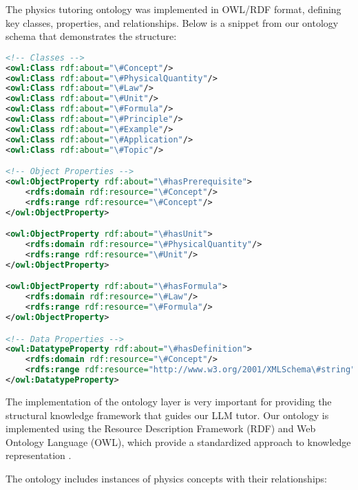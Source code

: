 The physics tutoring ontology was implemented in OWL/RDF format, defining key classes, properties, and relationships. Below is a snippet from our ontology schema that demonstrates the structure:

\begin{lstlisting}[language=XML, caption=Physics Tutor Ontology Schema, label=lst:ontology]
<!-- Classes -->
<owl:Class rdf:about="\#Concept"/>
<owl:Class rdf:about="\#PhysicalQuantity"/>
<owl:Class rdf:about="\#Law"/>
<owl:Class rdf:about="\#Unit"/>
<owl:Class rdf:about="\#Formula"/>
<owl:Class rdf:about="\#Principle"/>
<owl:Class rdf:about="\#Example"/>
<owl:Class rdf:about="\#Application"/>
<owl:Class rdf:about="\#Topic"/>

<!-- Object Properties -->
<owl:ObjectProperty rdf:about="\#hasPrerequisite">
    <rdfs:domain rdf:resource="\#Concept"/>
    <rdfs:range rdf:resource="\#Concept"/>
</owl:ObjectProperty>

<owl:ObjectProperty rdf:about="\#hasUnit">
    <rdfs:domain rdf:resource="\#PhysicalQuantity"/>
    <rdfs:range rdf:resource="\#Unit"/>
</owl:ObjectProperty>

<owl:ObjectProperty rdf:about="\#hasFormula">
    <rdfs:domain rdf:resource="\#Law"/>
    <rdfs:range rdf:resource="\#Formula"/>
</owl:ObjectProperty>

<!-- Data Properties -->
<owl:DatatypeProperty rdf:about="\#hasDefinition">
    <rdfs:domain rdf:resource="\#Concept"/>
    <rdfs:range rdf:resource="http://www.w3.org/2001/XMLSchema\#string"/>
</owl:DatatypeProperty>
\end{lstlisting}

The implementation of the ontology layer is very important for providing the structural knowledge framework that guides our LLM tutor. Our ontology is implemented using the Resource Description Framework (RDF) and Web Ontology Language (OWL), which provide a standardized approach to knowledge representation \cite{horrocks2024owl}.

The ontology includes instances of physics concepts with their relationships:

